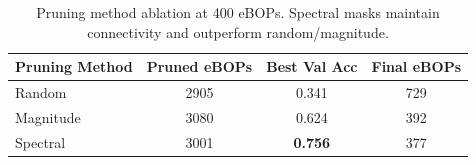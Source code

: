 \begin{table}[t]
\centering
\caption{Pruning method ablation at 400 eBOPs. Spectral masks maintain connectivity and outperform random/magnitude.}
\label{tab:pruning_ablation}
\begin{tabular}{lccc}
\toprule
Pruning Method & Pruned eBOPs & Best Val Acc & Final eBOPs \\
\midrule
Random & 2905 & 0.341 & 729 \\
Magnitude & 3080 & 0.624 & 392 \\
Spectral & 3001 & \textbf{0.756} & 377 \\
\bottomrule
\end{tabular}
\end{table}
